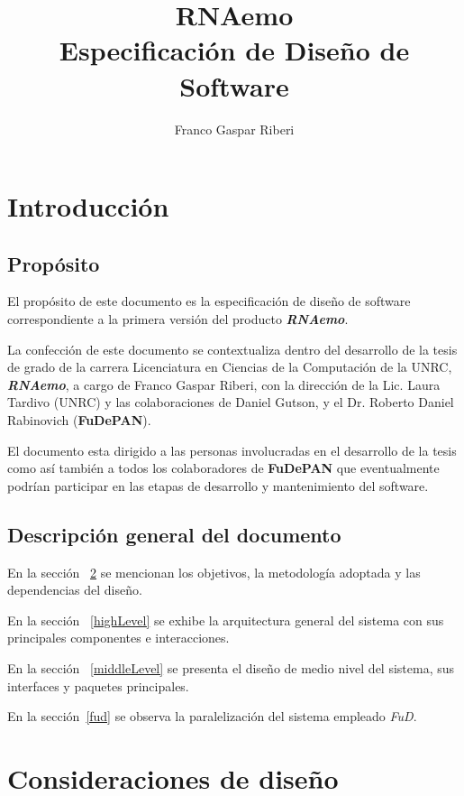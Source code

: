 \documentclass[12pt,a4paper,spanish]{article}
\title{\textbf{RNAemo}\\ \vspace{0.45cm} Especificación de Diseño de Software}
\author{Franco Gaspar Riberi}
\begin{document}
\maketitle\pagebreak{}\tableofcontents{}\pagebreak{}

\newpage

\section{Introducción}
\subsection{Propósito}

El propósito de este documento es la especificación de
diseño de software correspondiente a la primera versión del producto 
\emph{\textbf{RNAemo}}.

La confección de este documento se contextualiza dentro del desarrollo de la tesis
de grado de la carrera Licenciatura en Ciencias de la Computación de la UNRC,
\emph{\textbf{RNAemo}}, a cargo de Franco Gaspar Riberi, con la dirección
de la Lic. Laura Tardivo (UNRC) y las colaboraciones de Daniel
Gutson, y el Dr. Roberto Daniel Rabinovich
(\textbf{FuDePAN}).

El documento esta dirigido a las personas involucradas en el desarrollo de la
tesis como así también a todos los colaboradores de \textbf{FuDePAN} que eventualmente
podrían participar en las etapas de desarrollo y mantenimiento del software.

\subsection{Descripci\'on general del documento}
En la sección ~\ref{consideraciones} se mencionan los objetivos, la
metodología adoptada y las dependencias del diseño.

En la sección ~\ref{highLevel} se exhibe la arquitectura general del
sistema con sus principales componentes e interacciones.

En la sección ~\ref{middleLevel} se presenta el diseño de medio nivel del sistema,
sus interfaces y paquetes principales.
				    
En la sección~\ref{fud} se observa la paralelización del sistema empleado \emph{FuD}. 

\section{Consideraciones de diseño}
\label{consideraciones}
\end{document}
